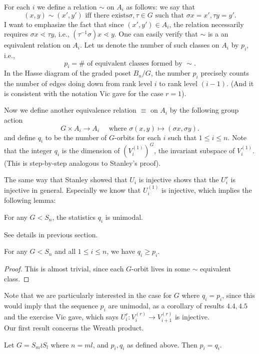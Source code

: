\documentclass[12pt]{article}
\newcommand{\1}{\mathbb{I}}
\newcommand{\ra}{\rightarrow}
\theoremstyle{definition}
\theoremstyle{definition}
\theoremstyle{definition}
\theoremstyle{definition}
\theoremstyle{definition}
\theoremstyle{definition}
\begin{document}
For each $i$ we define a relation $\sim$ on $A_i$ as follows: we say that $$(x, y) \sim (x', y') \text{ iff there exists}  \sigma, \tau \in G  \text{ such that } \sigma x = x', \tau y = y'.$$ I want to emphasize the fact that since $(x', y') \in A_i$, the relation necessarily requires $\sigma x \lessdot \tau y$, i.e., $(\tau^{-1} \sigma ) x \lessdot y$.  One can easily verify that $\sim$ is a an equivalent relation on $A_i$. Let us denote the number of such classes on $A_i$ by $p_i$, i.e., $$p_i = \# \text{ of equivalent classes formed by } \sim . $$  In the Hasse diagram of the graded poset $B_n/G$, the number $p_i$ precisely counts the number of edges doing down from rank level $i$ to rank level $(i-1)$. (And it is consistent with the notation Vic gave for the case $r = 1$).  

Now we define another equivalence relation $\equiv$ on $A_i$ by the following group action $$G \times A_i \ra A_i \quad \text{ where } \sigma (x, y) \mapsto (\sigma x, \sigma y ).$$ 
and define $q_i$ to be the number of $G$-orbits for each $i$ such that $ 1 \le i \le n$. Note that the integer $q_i$ is the dimension of $(V_i^{(1)})^G$, the invariant subspace of $V_i^{(1)}$. (This is step-by-step analogous to Stanley's proof). 

The same way that Stanley showed that $U_i$ is injective shows that the $U_i^{r}$ is injective in general. Especially we know that $U_i^{(1)}$ is injective, which implies the following lemma:

\lemma For any $G < S_n$, the statistics $q_i$ is unimodal. 

\proof See details in previous section.

\lemma For any  $G < S_n $ and all $1 \le i \le n$, we have $q_i \ge p_i$. 

\begin{proof} This is almost trivial, since each $G$-orbit lives in some $\sim$ equivalent class. 
\end{proof}

Note that we are particularly interested in the case for $G$ where $q_i = p_i$, since this would imply that the sequence $p_i$ are unimodal, as a corollary of results $4.4, 4.5$ and the exercise Vic gave, which says $U_i^{r}: V_i^{(r)} \ra V_{i+1}^{(r)}$ is injective.\\

Our first result concerns the Wreath product. 

\proposition Let $G = S_m \wr S_l$ where $n = ml$, and $p_i, q_i$ as defined above. Then $p_i = q_i$. 
\end{document}
